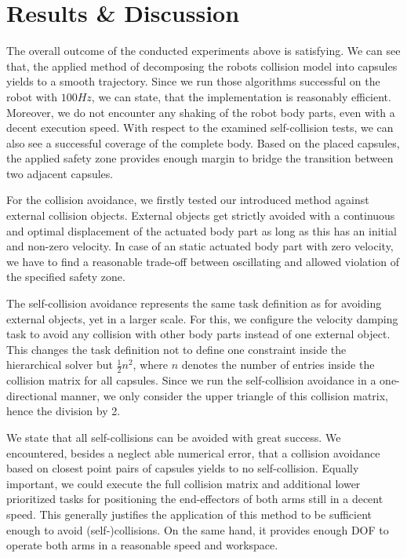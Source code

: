 \section{Results \& Discussion}\label{sec:results}

The overall outcome of the conducted experiments above is satisfying. We can see that, the applied method of decomposing the robots collision model into capsules yields to a smooth trajectory. Since we run those algorithms successful on the robot with $100Hz$, we can state, that the implementation is reasonably efficient. Moreover, we do not encounter any shaking of the robot body parts, even with a decent execution speed. With respect to the examined self-collision tests, we can also see a successful coverage of the complete body. Based on the placed capsules, the applied safety zone provides enough margin to bridge the transition between two adjacent capsules. 

For the collision avoidance, we firstly tested our introduced method against external collision objects. External objects get strictly avoided with a continuous and optimal displacement of the actuated body part as long as this has an initial and non-zero velocity. In case of an static actuated body part with zero velocity, we have to find a reasonable trade-off between oscillating and allowed violation of the specified safety zone. 

The self-collision avoidance represents the same task definition as for avoiding external objects, yet in a larger scale. For this, we configure the velocity damping task to avoid any collision with other body parts instead of one external object. This changes the task definition not to define one constraint inside the hierarchical solver but $\frac{1}{2}n^2$, where $n$ denotes the number of entries inside the collision matrix for all capsules. Since we run the self-collision avoidance in a one-directional manner, we only consider the upper triangle of this collision matrix, hence the division by 2. 

We state that all self-collisions can be avoided with great success. We encountered, besides a neglect able numerical error, that a collision avoidance based on closest point pairs of capsules yields to no self-collision. Equally important, we could execute the full collision matrix and additional lower prioritized tasks for positioning the end-effectors of both arms still in a decent speed. This generally justifies the application of this method to be sufficient enough to avoid (self-)collisions. On the same hand, it provides enough DOF to operate both arms in a reasonable speed and workspace.

